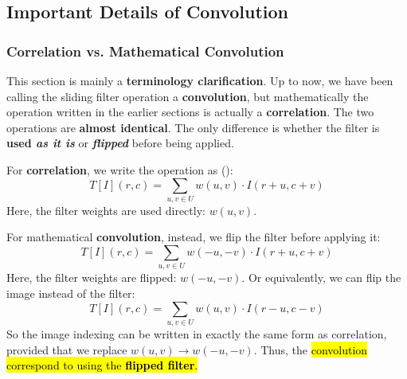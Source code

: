 \subsection{Important Details of Convolution}\label{sec:important-details-of-convolution}

\subsubsection{Correlation vs. Mathematical Convolution}\label{sec:correlation-vs-mathematical-convolution}

This section is mainly a \textbf{terminology clarification}. Up to now, we have been calling the sliding filter operation a \textbf{convolution}, but mathematically the operation written in the earlier sections is actually a \textbf{correlation}. The two operations are \textbf{almost identical}. The only difference is whether the filter is \textbf{used \emph{as it is}} or \textbf{\emph{flipped}} before being applied.

\highspace
For \textbf{correlation}, we write the operation as ():
\begin{equation*}
    T[I](r, c) = \sum_{u,v \in U} w(u, v) \cdot I(r + u, c + v)
\end{equation*}
Here, the filter weights are used directly: $w(u, v)$.

\highspace
For mathematical \textbf{convolution}, instead, we flip the filter before applying it:
\begin{equation*}
    T[I](r, c) = \sum_{u,v \in U} w(-u, -v) \cdot I(r + u, c + v)
\end{equation*}
Here, the filter weights are flipped: $w(-u, -v)$. Or equivalently, we can flip the image instead of the filter:
\begin{equation*}
    T[I](r, c) = \sum_{u,v \in U} w(u, v) \cdot I(r - u, c - v)
\end{equation*}
So the image indexing can be written in exactly the same form as correlation, provided that we replace $w(u, v) \to w(-u, -v)$. Thus, the \hl{convolution correspond to using the \textbf{flipped filter}.}

